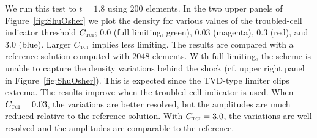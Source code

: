 \documentclass[letterpaper]{jpconf}
\newcommand{\TCI}{\textnormal{\tiny\textsc{TCI}}}
\begin{document}
We run this test to $t=1.8$ using $200$ elements.  
In the two upper panels of Figure~\ref{fig:ShuOsher} we plot the density for various values of the troubled-cell indicator threshold $C_{\TCI}$; $0.0$ (full limiting, green), $0.03$ (magenta), $0.3$ (red), and $3.0$ (blue).  
Larger $C_{\TCI}$ implies less limiting.  
The results are compared with a reference solution computed with $2048$ elements.  
With full limiting, the scheme is unable to capture the density variations behind the shock (cf. upper right panel in Figure~\ref{fig:ShuOsher}).  
This is expected since the TVD-type limiter clips extrema.  
The results improve when the troubled-cell indicator is used.  
When $C_{\TCI}=0.03$, the variations are better resolved, but the amplitudes are much reduced relative to the reference solution.  
With $C_{\TCI}=3.0$, the variations are well resolved and the amplitudes are comparable to the reference.  
\end{document}
